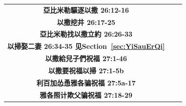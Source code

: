 \begin{table}[H]
\begin{threeparttable}
\begin{tabular}{c c c}
\multicolumn{1}{L{\dimexpr0.5\linewidth-1\tabcolsep\relax}}{\bfseries 亞比米勒驅逐以撒 26:12-16}  
& \multicolumn{1}{L{\dimexpr0.2\linewidth-1\tabcolsep\relax}}{\bfseries }
& \multicolumn{1}{L{\dimexpr0.1\linewidth-1\tabcolsep\relax}}{\bfseries }\\ 

\multicolumn{1}{L{\dimexpr0.5\linewidth-1\tabcolsep\relax}}{\bfseries 以撒挖井 26:17-25}  
& \multicolumn{1}{L{\dimexpr0.2\linewidth-1\tabcolsep\relax}}{\bfseries }
& \multicolumn{1}{L{\dimexpr0.1\linewidth-1\tabcolsep\relax}}{\bfseries }\\ 

\multicolumn{1}{L{\dimexpr0.5\linewidth-1\tabcolsep\relax}}{\bfseries 亞比米勒找以撒立約 26:26-33}  
& \multicolumn{1}{L{\dimexpr0.2\linewidth-1\tabcolsep\relax}}{\bfseries }
& \multicolumn{1}{L{\dimexpr0.1\linewidth-1\tabcolsep\relax}}{\bfseries }\\ 

\multicolumn{1}{L{\dimexpr0.5\linewidth-1\tabcolsep\relax}}{\bfseries 以掃娶二妻 26:34-35 见Section~\ref{sec:YiSauErQi}}  
& \multicolumn{1}{L{\dimexpr0.2\linewidth-1\tabcolsep\relax}}{\bfseries }
& \multicolumn{1}{L{\dimexpr0.1\linewidth-1\tabcolsep\relax}}{\bfseries }\\ 


\multicolumn{1}{L{\dimexpr0.5\linewidth-1\tabcolsep\relax}}{\bfseries 以撒給兒子們祝福 27:1-46}  
& \multicolumn{1}{L{\dimexpr0.2\linewidth-1\tabcolsep\relax}}{\bfseries }
& \multicolumn{1}{L{\dimexpr0.1\linewidth-1\tabcolsep\relax}}{\bfseries }\\ 

\multicolumn{1}{L{\dimexpr0.5\linewidth-1\tabcolsep\relax}}{\bfseries 以撒要祝福以掃 27:1-5b}  
& \multicolumn{1}{L{\dimexpr0.2\linewidth-1\tabcolsep\relax}}{\bfseries }
& \multicolumn{1}{L{\dimexpr0.1\linewidth-1\tabcolsep\relax}}{\bfseries }\\ 

\multicolumn{1}{L{\dimexpr0.5\linewidth-1\tabcolsep\relax}}{\bfseries 利百加怂恿雅各骗祝福 27:5a-17}  
& \multicolumn{1}{L{\dimexpr0.2\linewidth-1\tabcolsep\relax}}{\bfseries }
& \multicolumn{1}{L{\dimexpr0.1\linewidth-1\tabcolsep\relax}}{\bfseries }\\ 

\multicolumn{1}{L{\dimexpr0.5\linewidth-1\tabcolsep\relax}}{\bfseries 雅各照计欺父骗祝福 27:18-29}  
& \multicolumn{1}{L{\dimexpr0.2\linewidth-1\tabcolsep\relax}}{\bfseries }
& \multicolumn{1}{L{\dimexpr0.1\linewidth-1\tabcolsep\relax}}{\bfseries }\\ 


\end{tabular}
\end{threeparttable}
\end{table}
